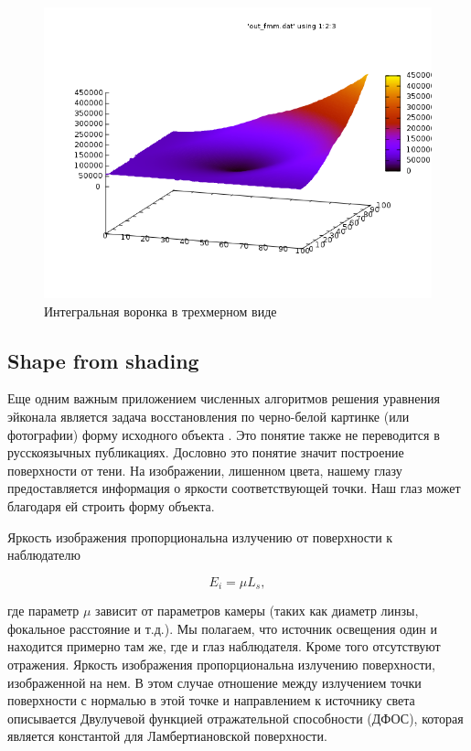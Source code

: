 \begin{figure}[H]
  \centering
  \includegraphics[width=\linewidth]{img/impulse-example.png}
  \hfil \caption{Интегральная воронка в трехмерном виде}
  \label{fig:impulse-example}
\end{figure}


\subsection{Shape from shading}
\label{sec:shape-from-shading}

Еще одним важным приложением численных алгоритмов решения уравнения
эйконала является задача восстановления по черно-белой картинке (или
фотографии) форму исходного объекта \cite{SFS2009,JDM2008}. Это понятие также
не переводится в русскоязычных публикациях.  Дословно это понятие
значит построение поверхности от тени. На изображении, лишенном цвета,
нашему глазу предоставляется информация о яркости соответствующей
точки. Наш глаз может благодаря ей строить форму объекта.  

Яркость изображения пропорциональна излучению от поверхности к
наблюдателю

\begin{equation}
  \label{eq:sfs:1}
  E_i=\mu L_s,
\end{equation}

где параметр $\mu$ зависит от параметров камеры (таких как диаметр
линзы, фокальное расстояние и т.д.).
Мы полагаем, что источник освещения один и находится примерно там же,
где и глаз наблюдателя. Кроме того отсутствуют отражения. Яркость
изображения пропорциональна излучению поверхности, изображенной на
нем. В этом случае отношение между излучением точки поверхности с
нормалью в этой точке и направлением к источнику света описывается 
Двулучевой функцией отражательной способности (ДФОС), которая является
константой для Ламбертиановской поверхности.

